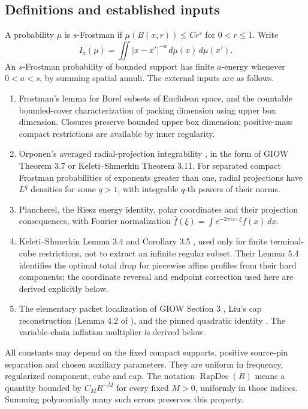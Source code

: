 \documentclass[11pt]{article}
\theoremstyle{definition}\newtheorem{remark}[theorem]{Remark}
\newcommand{\dd}{\,d}\newcommand{\norm}[1]{\left\|#1\right\|}\newcommand{\eps}{\varepsilon}
\begin{document}
\subsection{Definitions and established inputs}
A probability \(\mu\) is \(s\)-Frostman if
\(\mu(B(x,r))\le C r^s\) for \(0<r\le1\). Write
$$
 I_a(\mu)=\iint |x-x'|^{-a}\dd\mu(x)\dd\mu(x').
$$
An \(s\)-Frostman probability of bounded support has finite \(a\)-energy
whenever \(0<a<s\), by summing spatial annuli.
The external inputs are as follows.
\begin{enumerate}
\item Frostman's lemma for Borel subsets of Euclidean space, and the
countable bounded-cover characterization of packing dimension using upper box dimension.
Closures preserve bounded upper box dimension; positive-mass compact restrictions
are available by inner regularity.
\item Orponen's averaged radial-projection integrability \cite{orponen}, in the form
of GIOW Theorem 3.7 or Keleti--Shmerkin Theorem 3.11. For separated compact
Frostman probabilities of exponents greater than one, radial projections have
\(L^q\) densities for some \(q>1\), with integrable \(q\)-th powers of their norms.
\item Plancherel, the Riesz energy identity, polar coordinates and their projection
consequences, with Fourier normalization
\(\widehat f(\xi)=\int e^{-2\pi i x\cdot\xi}f(x)\,dx\).
\item Keleti--Shmerkin Lemma 3.4 and Corollary 3.5 \cite{ks}, used only for finite
terminal-cube restrictions, not to extract an infinite regular subset.
Their Lemma 5.4 identifies the optimal total drop for piecewise affine
profiles from their hard components; the coordinate reversal and endpoint
correction used here are derived explicitly below.
\item The elementary packet localization of GIOW Section 3 \cite{giow},
Liu's cap reconstruction (Lemma 4.2 of \cite{liu2026}), and the pinned quadratic
identity \cite{liuidentity}. The variable-chain inflation multiplier is derived below.
\end{enumerate}
All constants may depend on the fixed compact supports, positive source-pin
separation and chosen auxiliary parameters. They are uniform in frequency,
regularized component, cube and cap. The notation \(\operatorname{RapDec}(R)\)
means a quantity bounded by \(C_MR^{-M}\) for every fixed \(M>0\), uniformly
in those indices. Summing polynomially many such errors preserves this property.
\end{document}
